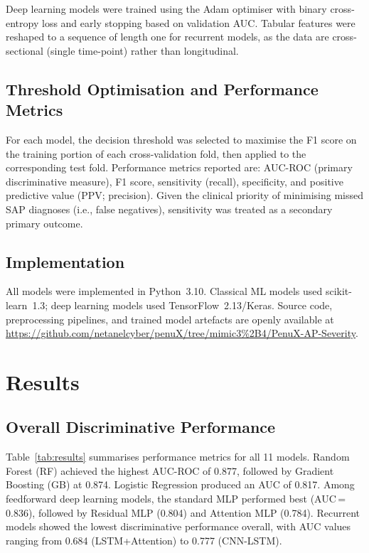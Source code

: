 \documentclass[12pt,a4paper]{article}
\begin{document}
Deep learning models were trained using the Adam optimiser with binary cross-entropy loss and early stopping based on validation AUC. Tabular features were reshaped to a sequence of length one for recurrent models, as the data are cross-sectional (single time-point) rather than longitudinal.

\subsection{Threshold Optimisation and Performance Metrics}

For each model, the decision threshold was selected to maximise the F1 score on the training portion of each cross-validation fold, then applied to the corresponding test fold. Performance metrics reported are: AUC-ROC (primary discriminative measure), F1 score, sensitivity (recall), specificity, and positive predictive value (PPV; precision). Given the clinical priority of minimising missed SAP diagnoses (i.e., false negatives), sensitivity was treated as a secondary primary outcome.

\subsection{Implementation}

All models were implemented in Python~3.10. Classical ML models used scikit-learn~1.3; deep learning models used TensorFlow~2.13/Keras. Source code, preprocessing pipelines, and trained model artefacts are openly available at \url{https://github.com/netanelcyber/penuX/tree/mimic3%2B4/PenuX-AP-Severity}.

\section{Results}

\subsection{Overall Discriminative Performance}

Table~\ref{tab:results} summarises performance metrics for all 11 models. Random Forest (RF) achieved the highest AUC-ROC of 0.877, followed by Gradient Boosting (GB) at 0.874. Logistic Regression produced an AUC of 0.817. Among feedforward deep learning models, the standard MLP performed best (AUC\,=\,0.836), followed by Residual MLP (0.804) and Attention MLP (0.784). Recurrent models showed the lowest discriminative performance overall, with AUC values ranging from 0.684 (LSTM+Attention) to 0.777 (CNN-LSTM).
\end{document}
